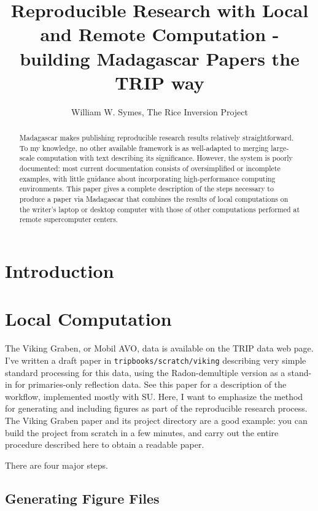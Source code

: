 \title{Reproducible Research with Local and Remote Computation - building Madagascar Papers the TRIP way}
\date{}
\author{William W. Symes, The Rice Inversion Project}

\maketitle 
\parskip 12pt 
\begin{abstract}
Madagascar makes publishing reproducible research results relatively straightforward. To my knowledge, no other available framework is as well-adapted to merging large-scale computation with text describing its significance. However, the system is poorly documented: most current documentation consists of oversimplified or incomplete examples, with little guidance about incorporating high-performance computing environments. This paper gives a complete description of the steps necessary to produce a paper via Madagascar that combines the results of local computations on the writer's laptop or desktop computer with those of other computations performed at remote supercomputer centers.
\end{abstract}

\section{Introduction}
\section{Local Computation}
The Viking Graben, or Mobil AVO, data is available on the TRIP data web page. 
I've written a draft paper in {\tt tripbooks/scratch/viking} describing very simple standard processing for this data, using the Radon-demultiple version as a stand-in for primaries-only reflection data. See this paper for a description of the workflow, implemented mostly with SU. Here, I want to emphasize the method for generating and including figures as part of the reproducible research process. The Viking Graben paper and its project directory are a good example: you can build the project from scratch in a few minutes, and carry out the entire procedure described here to obtain a readable paper.

There are four major steps.

\subsection{Generating Figure Files}

